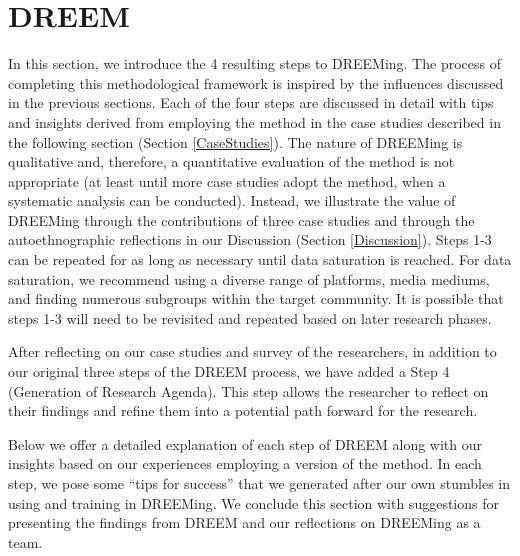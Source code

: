 

  
\section{DREEM} \label{DREEM}
In this section, we introduce the 4 resulting steps to DREEMing. The process of completing this methodological framework is inspired by the influences discussed in the previous sections. Each of the four steps are discussed in detail with tips and insights derived from employing the method in the case studies described in the following section (Section \ref{CaseStudies}). The nature of DREEMing is qualitative and, therefore, a quantitative evaluation of the method is not appropriate (at least until more case studies adopt the method, when a systematic analysis can be conducted). Instead, we illustrate the value of DREEMing through the contributions of three case studies and through the autoethnographic reflections \cite{ramboAutoethnography2020} in our Discussion (Section \ref{Discussion}). Steps 1-3 can be repeated for as long as necessary until data saturation is reached. For data saturation, we recommend using a diverse range of platforms, media mediums, and finding numerous subgroups within the target community.  It is possible that steps 1-3 will need to be revisited and repeated based on later research phases. 

After reflecting on our case studies and survey of the researchers, in addition to our original three steps of the DREEM process, we have added a Step 4 (Generation of Research Agenda). This step allows the researcher to reflect on their findings and refine them into a potential path forward for the research.

Below we offer a detailed explanation of each step of DREEM along with our insights based on our experiences employing a version of the method. In each step, we pose some ``tips for success'' that we generated after our own stumbles in using and training in DREEMing. We conclude this section with suggestions for presenting the findings from DREEM and our reflections on DREEMing as a team.

